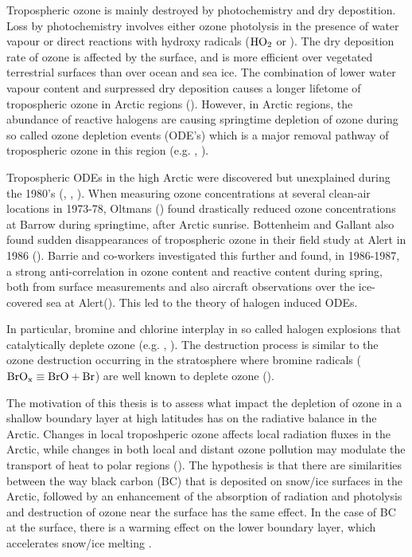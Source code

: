 Tropospheric ozone is mainly destroyed by photochemistry and dry depostition. Loss by photochemistry involves either ozone photolysis in the presence of water vapour or direct reactions with hydroxy radicals ($\mathrm{HO_2}$ or ). The dry deposition rate of ozone is affected by the surface, and is more efficient over vegetated terrestrial surfaces than over ocean and sea ice. The combination of lower water vapour content and surpressed dry deposition causes a longer lifetome of tropospheric ozone in Arctic regions (\cite{AMAP2015}). However, in Arctic regions, the abundance of reactive halogens are causing springtime depletion of ozone during so called ozone depletion events (ODE's)  which is a major removal pathway of tropospheric ozone in this region (e.g. \cite{Simpson2015}, \cite{AMAP2015}).

\medskip

Tropospheric ODEs in the high Arctic were discovered but unexplained during the 1980's (\cite{Oltmans1981}, \cite{oltmans1986surface}, \cite{bottenheim1986measurements}). When measuring ozone concentrations at several clean-air locations in 1973-78, Oltmans (\cite{Oltmans1981}) found drastically reduced ozone concentrations at Barrow during springtime, after Arctic sunrise. Bottenheim and Gallant also found sudden disappearances of tropospheric ozone in their field study at Alert in 1986 (\cite{bottenheim1986measurements}). Barrie and co-workers investigated this further and found, in 1986-1987, a strong anti-correlation in ozone content and reactive  content during spring, both from surface measurements and also aircraft observations over the ice-covered sea at Alert(\cite{barrie}). This led to the theory of halogen induced ODEs. 

\medskip

In particular, bromine and chlorine interplay in so called halogen explosions that catalytically deplete ozone (e.g. \cite{CAO}, \cite{Simpson2015}). The destruction process is similar to the ozone destruction occurring in the stratosphere where bromine radicals ($\mathrm{BrO_x} \equiv \mathrm{BrO} + \mathrm{Br}$) are well known to deplete ozone (\cite{Parella}).   

\medskip

The motivation of this thesis is to assess what impact the depletion of ozone in a shallow boundary layer at high latitudes has on the radiative balance in the Arctic. Changes in local troposhperic ozone affects local radiation fluxes in the Arctic, while changes in both local and distant ozone pollution may modulate the transport of heat to polar regions (\cite{Shindell2007}). The hypothesis is that there are similarities between the way black carbon (BC) that is deposited on snow/ice surfaces in the Arctic, followed by an enhancement of the absorption of radiation and photolysis and destruction of ozone near the surface has the same effect. In the case of BC at the surface, there is a warming effect on the lower boundary layer, which accelerates snow/ice melting \cite{AMAP2015}. 

